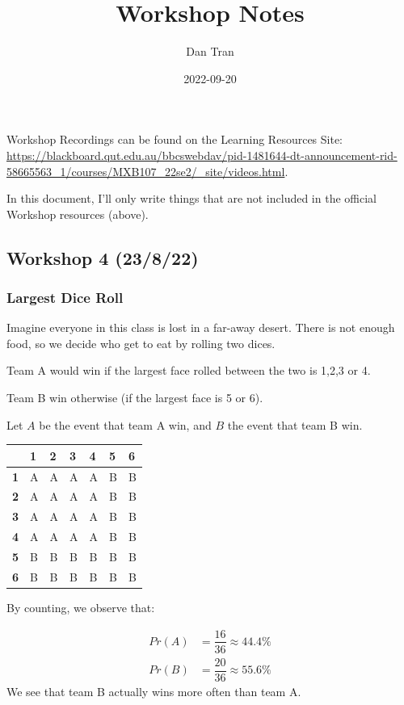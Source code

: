 \documentclass[
]{article}
\title{Workshop Notes}
\author{Dan Tran}
\date{2022-09-20}
\begin{document}
\maketitle

{
\setcounter{tocdepth}{3}
\tableofcontents
}
Workshop Recordings can be found on the Learning Resources Site:
\url{https://blackboard.qut.edu.au/bbcswebdav/pid-1481644-dt-announcement-rid-58665563_1/courses/MXB107_22se2/_site/videos.html}.

In this document, I'll only write things that are not included in the
official Workshop resources (above).

\hypertarget{workshop-4-23822}{%
\subsection{Workshop 4 (23/8/22)}\label{workshop-4-23822}}

\hypertarget{largest-dice-roll}{%
\subsubsection{Largest Dice Roll}\label{largest-dice-roll}}

Imagine everyone in this class is lost in a far-away desert. There is
not enough food, so we decide who get to eat by rolling two dices.

Team A would win if the largest face rolled between the two is 1,2,3 or
4.

Team B win otherwise (if the largest face is 5 or 6).

Let \(A\) be the event that team A win, and \(B\) the event that team B
win.

\begin{longtable}[]{@{}lllllll@{}}
\toprule
& 1 & 2 & 3 & 4 & 5 & 6 \\
\midrule
\endhead
\textbf{1} & A & A & A & A & B & B \\
\textbf{2} & A & A & A & A & B & B \\
\textbf{3} & A & A & A & A & B & B \\
\textbf{4} & A & A & A & A & B & B \\
\textbf{5} & B & B & B & B & B & B \\
\textbf{6} & B & B & B & B & B & B \\
\bottomrule
\end{longtable}

By counting, we observe that:

\[
\begin{aligned}
Pr(A) &= \dfrac{16}{36} \approx 44.4\% \\
Pr(B) &= \dfrac{20}{36} \approx 55.6\%
\end{aligned}
\] We see that team B actually wins more often than team A.
\end{document}
